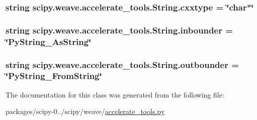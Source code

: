 \subsubsection[{cxxtype}]{\setlength{\rightskip}{0pt plus 5cm}string scipy.\+weave.\+accelerate\+\_\+tools.\+String.\+cxxtype = \char`\"{}char$\ast$\char`\"{}\hspace{0.3cm}{\ttfamily [static]}}\label{classscipy_1_1weave_1_1accelerate__tools_1_1String_ac60a91df86cc739c49b0367ed7083448}
\hypertarget{classscipy_1_1weave_1_1accelerate__tools_1_1String_a6ee3b38aa7415e19a3682bbf01d54995}{}
\subsubsection[{inbounder}]{\setlength{\rightskip}{0pt plus 5cm}string scipy.\+weave.\+accelerate\+\_\+tools.\+String.\+inbounder = \char`\"{}Py\+String\+\_\+\+As\+String\char`\"{}\hspace{0.3cm}{\ttfamily [static]}}\label{classscipy_1_1weave_1_1accelerate__tools_1_1String_a6ee3b38aa7415e19a3682bbf01d54995}
\hypertarget{classscipy_1_1weave_1_1accelerate__tools_1_1String_aa296dcc9d4ee8f095f26ceb618e15a10}{}
\subsubsection[{outbounder}]{\setlength{\rightskip}{0pt plus 5cm}string scipy.\+weave.\+accelerate\+\_\+tools.\+String.\+outbounder = \char`\"{}Py\+String\+\_\+\+From\+String\char`\"{}\hspace{0.3cm}{\ttfamily [static]}}\label{classscipy_1_1weave_1_1accelerate__tools_1_1String_aa296dcc9d4ee8f095f26ceb618e15a10}


The documentation for this class was generated from the following file\+:\begin{DoxyCompactItemize}
\item 
packages/scipy-\/0../scipy/weave/\hyperlink{accelerate__tools_8py}{accelerate\+\_\+tools.\+py}\end{DoxyCompactItemize}
